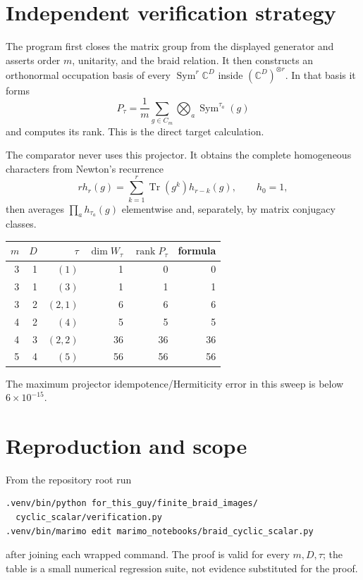 \documentclass[11pt]{article}
\begin{document}
\section{Independent verification strategy}
The program first closes the matrix group from the displayed generator and
asserts order $m$, unitarity, and the braid relation.  It then constructs an
orthonormal occupation basis of every $\operatorname{Sym}^{r}\mathbb C^D$
inside $(\mathbb C^D)^{\otimes r}$.  In that basis it forms
\[
 P_\tau=\frac1m\sum_{g\in C_m}\bigotimes_a\operatorname{Sym}^{\tau_a}(g)
\]
and computes its rank.  This is the direct target calculation.

The comparator never uses this projector.  It obtains the complete
homogeneous characters from Newton's recurrence
\[
 r h_r(g)=\sum_{k=1}^r\operatorname{Tr}(g^k)h_{r-k}(g),\qquad h_0=1,
\]
then averages $\prod_a h_{\tau_a}(g)$ elementwise and, separately, by
matrix conjugacy classes.

\begin{center}
\begin{tabular}{@{}rrrrrr@{}}\toprule
$m$&$D$&$\tau$&$\dim W_\tau$&$\operatorname{rank}P_\tau$&formula\\\midrule
3&1&$(1)$&1&0&0\\
3&1&$(3)$&1&1&1\\
3&2&$(2,1)$&6&6&6\\
4&2&$(4)$&5&5&5\\
4&3&$(2,2)$&36&36&36\\
5&4&$(5)$&56&56&56\\\bottomrule
\end{tabular}
\end{center}
The maximum projector idempotence/Hermiticity error in this sweep is below
$6\times10^{-15}$.

\section{Reproduction and scope}
From the repository root run
\begin{verbatim}
.venv/bin/python for_this_guy/finite_braid_images/
  cyclic_scalar/verification.py
.venv/bin/marimo edit marimo_notebooks/braid_cyclic_scalar.py
\end{verbatim}
after joining each wrapped command.  The proof is valid for every $m,D,\tau$;
the table is a small numerical regression suite, not evidence substituted for
the proof.
\end{document}
